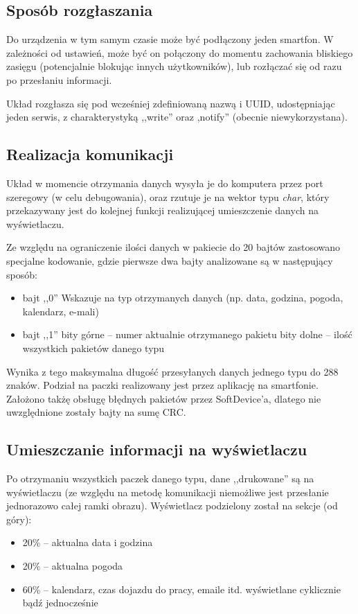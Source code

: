 \documentclass[a4paper,11pt]{article}
\begin{document}
\subsection{Sposób rozgłaszania}
Do urządzenia w tym samym czasie może być podłączony jeden smartfon. W zależności od ustawień, 
 może być on połączony do momentu zachowania bliskiego zasięgu (potencjalnie blokując innych użytkowników),  
lub rozłączać się od razu po przesłaniu informacji. 

Układ rozgłasza się pod wcześniej zdefiniowaną nazwą i UUID, udostępniając jeden serwis, z charakterystyką ,,write'' oraz ,notify'' (obecnie niewykorzystana).

\subsection{Realizacja komunikacji}
Układ w momencie otrzymania danych wysyła je do komputera przez port szeregowy (w celu debugowania), oraz rzutuje je na wektor typu \textit{char}, który przekazywany jest do kolejnej funkcji realizującej umieszczenie danych na wyświetlaczu.

Ze względu na ograniczenie ilości danych w pakiecie do 20 bajtów zastosowano specjalne kodowanie, gdzie pierwsze dwa bajty analizowane są w następujący sposób: 
\begin{itemize}
	\item bajt ,,0''
	\subitem Wskazuje na typ otrzymanych danych (np. data, godzina, pogoda, kalendarz, e-mali) 
	\item bajt ,,1''
	 bity górne -- numer aktualnie otrzymanego pakietu
	 bity dolne -- ilość wszystkich pakietów danego typu
\end{itemize}
Wynika z tego maksymalna długość przesyłanych danych jednego typu do 288 znaków. Podział na paczki realizowany jest przez aplikację na smartfonie. Założono takżę obsługę błędnych pakietów przez SoftDevice'a, dlatego nie uwzględnione zostały bajty na sumę CRC.

\subsection{Umieszczanie informacji na wyświetlaczu}
Po otrzymaniu wszystkich paczek danego typu, dane ,,drukowane'' są na wyświetlaczu (ze względu na metodę komunikacji niemożliwe jest przesłanie jednorazowo całej ramki obrazu). Wyświetlacz podzielony został na sekcje (od góry):
\begin{itemize}
	\item 20\% -- aktualna data i godzina
	\item 20\% -- aktualna pogoda
	\item 60\% -- kalendarz, czas dojazdu do pracy, emaile itd. wyświetlane cyklicznie bądź jednocześnie
\end{itemize}
\end{document}
